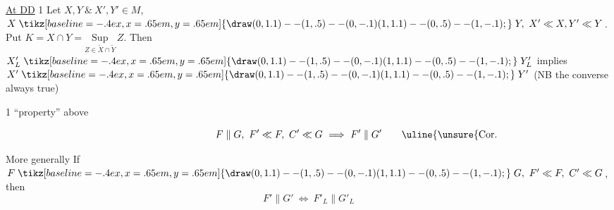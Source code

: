 \uline{At DD} 1 Let  $X,Y\ \&\ X',Y'\in M$, $X\mathrel{\tikz[baseline=-.4ex,x=.65em,y=.65em]{\draw (0,1.1)--(1,.5)--(0,-.1) (1,1.1)--(0,.5)--(1,-.1);}}Y,\ X'\ll X,Y'\ll Y$. Put $K=X\cap Y=\underset{Z\in\widetilde X\cap\widetilde Y}{\mathrm{Sup}}\,Z$. Then $X'_{L}\mathrel{\tikz[baseline=-.4ex,x=.65em,y=.65em]{\draw (0,1.1)--(1,.5)--(0,-.1) (1,1.1)--(0,.5)--(1,-.1);}}Y'_{L}$ implies $X'\mathrel{\tikz[baseline=-.4ex,x=.65em,y=.65em]{\draw (0,1.1)--(1,.5)--(0,-.1) (1,1.1)--(0,.5)--(1,-.1);}}Y'$ \quad (NB the converse  always true)

\uline{} 1 \quad {} ``property'' above

\[
F\parallel G,\ F'\ll F,\ C'\ll G\ \Longrightarrow\ F'\parallel G'
\tag*{\makebox[0pt][r]{\makebox[\displaywidth][l]{\uline{\unsure{Cor. Main|Corollary}} 2}}}
\]

More generally \quad If $F\mathrel{\tikz[baseline=-.4ex,x=.65em,y=.65em]{\draw (0,1.1)--(1,.5)--(0,-.1) (1,1.1)--(0,.5)--(1,-.1);}}G,\ F'\ll F,\ C'\ll G$, then
\[
 F'\parallel G'\ \Longleftrightarrow\ F'_{L}\parallel G'_{L}
\]
